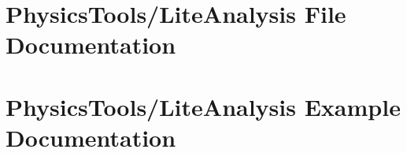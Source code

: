 \documentclass[a4paper]{book}
\begin{document}
\chapter{Physics\-Tools/Lite\-Analysis File Documentation}














\chapter{Physics\-Tools/Lite\-Analysis Example Documentation}



\printindex
\end{document}
